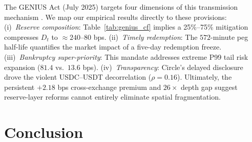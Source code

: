 \documentclass[12pt,twocolumn]{article}
\begin{document}
\begin{table}[H]
\label{tab:genius_cf}
\footnotesize
{}
\caption{Illustrative GENIUS Act scenario range (not causal): assumed mitigation of the reserve lock-up shock mapped to implied crisis $D_t$ means from observed moments.}
\end{table}

The GENIUS Act (July 2025) targets four dimensions of this transmission mechanism \cite{genius2025}. We map our empirical results directly to these provisions: (i)~\textit{Reserve composition}: Table~\ref{tab:genius_cf} implies a 25\%--75\% mitigation compresses $D_t$ to ${\approx}240$--$80$ bps. (ii)~\textit{Timely redemption}: The $572$-minute peg half-life quantifies the market impact of a five-day redemption freeze. (iii)~\textit{Bankruptcy super-priority}: This mandate addresses extreme P99 tail risk expansion ($81.4$ vs.\ $13.6$ bps). (iv)~\textit{Transparency}: Circle's delayed disclosure drove the violent USDC--USDT decorrelation ($\rho{=}0.16$). Ultimately, the persistent $+2.18$ bps cross-exchange premium and $26\times$ depth gap suggest reserve-layer reforms cannot entirely eliminate spatial fragmentation.

\section{Conclusion}\label{sec:conclusion}
\end{document}
